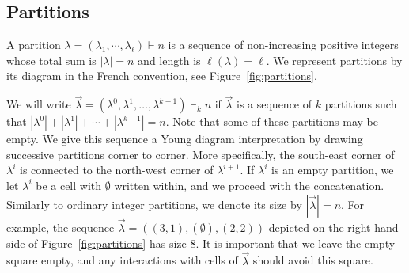 \documentclass[a4paper,12pt]{amsart}
\theoremstyle{plain}
\theoremstyle{definition}
\theoremstyle{remark}
\begin{document}
\subsection{Partitions}

A partition $\lambda= (\lambda_1 , \cdots ,\lambda_{\ell}) \vdash n$ is a sequence of non-increasing positive integers whose total sum is $|\lambda|= n$ and length is $\ell(\lambda) = \ell$. We represent partitions by its diagram in the French convention, see Figure~\ref{fig:partitions}. 

We will write $\vec{\lambda} = (\lambda^0, \lambda^1, \dots, \lambda^{k-1}) \vdash_k n$ if $\vec{\lambda}$ is a sequence of $k$ partitions such that $|\lambda^0| + |\lambda^1| +\cdots + |\lambda^{k-1}| = n$. Note that some of these partitions may be empty. We give this sequence a Young diagram interpretation by drawing successive partitions corner to corner. More specifically, the south-east corner of $\lambda^i$ is connected to the north-west corner of $\lambda^{i+1}$. If $\lambda^i$ is an empty partition, we let $\lambda^i$ be a cell with $\emptyset$ written within, and we proceed with the concatenation. Similarly to ordinary integer partitions, we denote its size by $|\vec{\lambda}| = n$.
For example, the sequence $\vec{\lambda} = ((3,1),(\emptyset),(2,2))$ depicted on the right-hand side of Figure~\ref{fig:partitions} has size $8$. It is important that we leave the empty square empty, and any interactions with cells of $\vec{\lambda}$ should avoid this square. 
\\
\end{document}

